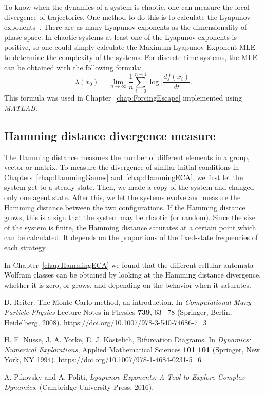 To know when the dynamics of a system is chaotic, one can measure the local divergence of trajectories. One method to do this is to calculate the Lyapunov exponents~\cite{LyaExp}. There are as many Lyapunov exponents as the dimensionality of phase space. In chaotic systems at least one of the Lyapunov exponents is positive, so one could simply calculate the Maximum Lyapunov Exponent MLE to determine the complexity of the systems. For discrete time systems, the MLE can be obtained with the following formula:
\begin{equation}
\lambda(x_0) = \lim_{n \to \infty}\dfrac{1}{n}\sum_{i=0}^{n-1}\log|\dfrac{df(x_i)}{dt}.
\end{equation}
This formula was used in Chapter~\ref{chap:ForcingEscape} implemented using \textit{MATLAB}.

\subsection{Hamming distance divergence measure}

The Hamming distance measures the number of different elements in a group, vector or matrix. To measure the divergence of similar initial conditions in Chapters~\ref{chap:HammingGames} and~\ref{chap:HammingECA}, we first let the system get to a steady state. Then, we made a copy of the system and changed only one agent state. After this, we let the systems evolve and measure the Hamming distance between the two configurations. If the Hamming distance grows, this is a sign that the system may be chaotic (or random). Since the size of the system is finite, the Hamming distance saturates at a certain point which can be calculated. It depends on the proportions of the fixed-state frequencies of each strategy.

In Chapter~\ref{chap:HammingECA} we found that the different cellular automata Wolfram classes can be obtained by looking at the Hamming distance divergence, whether it is zero, or grows, and depending on the behavior when it saturates.



\begin{thebibliography}{02}


D. Reiter. The Monte Carlo method, an introduction. In \textit{Computational Many-Particle Physics}
Lecture Notes in  Physics \textbf{739}, 63–-78 (Springer, Berlin, Heidelberg, 2008).
\url{https://doi.org/10.1007/978-3-540-74686-7_3}


H. E. Nusse, J. A. Yorke, E. J. Kostelich, 
Bifurcation Diagrams. In \textit{Dynamics: Numerical Explorations},
Applied Mathematical Sciences \textbf{101} \textbf{101} (Springer, New York, NY 1994).
\url{https://doi.org/10.1007/978-1-4684-0231-5_6}


A. Pikovsky and A. Politi, 
\textit{Lyapunov Exponents: A Tool to Explore Complex Dynamics},
(Cambridge University Press, 2016).




\end{thebibliography}
